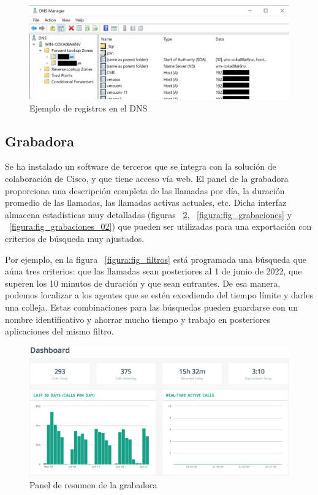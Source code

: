 \documentclass[a4paper, 12pt]{book}
\begin{document}
\begin{figure}
  \centering
  \includegraphics[scale=0.8]{img/fig_dominios}
  \caption{Ejemplo de registros en el DNS}
  \label{figura:fig_dominios}
\end{figure}

\subsection{Grabadora}
\label{sec:grabadora}
Se ha instalado un software de terceros que se integra con la solución de colaboración de Cisco, y que tiene acceso vía web. El panel de la grabadora proporciona una descripción completa de las llamadas por día, la duración promedio de las llamadas, las llamadas activas actuales, etc. Dicha interfaz almacena estadísticas muy detalladas (figuras ~\ref{figura:fig_portada_recorder}, ~\ref{figura:fig_grabaciones} y ~\ref{figura:fig_grabaciones_02}) que pueden ser utilizadas para una exportación con criterios de búsqueda muy ajustados.

Por ejemplo, en la figura ~\ref{figura:fig_filtros} está programada una búsqueda que aúna tres criterios: que las llamadas sean posteriores al 1 de junio de 2022, que superen los 10 minutos de duración y que sean entrantes. 
De esa manera, podemos localizar a los agentes que se estén excediendo del tiempo límite y darles una colleja.
Estas combinaciones para las búsquedas pueden guardarse con un nombre identificativo y ahorrar mucho tiempo y trabajo en posteriores aplicaciones del mismo filtro.

\begin{figure}[h!]
  \centering
  \includegraphics[scale=0.65]{img/fig_portada_recorder}
  \caption{Panel de resumen de la grabadora}
  \label{figura:fig_portada_recorder}
\end{figure}
\end{document}
